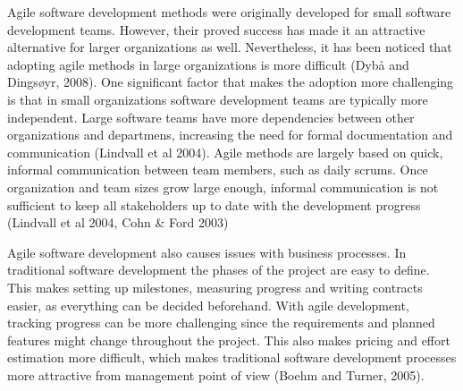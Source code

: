 Agile software development methods were originally developed for small
software development teams. However, their proved success has made it an
attractive alternative for larger organizations as well. Nevertheless,
it has been noticed that adopting agile methods in large organizations
is more difficult (Dybå and Dingsøyr, 2008). One significant factor
that makes the adoption more challenging is that in small organizations
software development teams are typically more independent. Large
software teams have more dependencies between other organizations
and departmens, increasing the need for formal documentation and
communication (Lindvall et al 2004). Agile methods are largely based
on quick, informal communication between team members, such as daily
scrums. Once organization and team sizes grow large enough, informal
communication is not sufficient to keep all stakeholders up to date with
the development progress (Lindvall et al 2004, Cohn \& Ford 2003)

Agile software development also causes issues with business processes.
In traditional software development the phases of the project are easy to
define. This makes setting up milestones, measuring progress and writing
contracts easier, as everything can be decided beforehand. With agile
development, tracking progress can be more challenging since the requirements
and planned features might change throughout the project. This also makes
pricing and effort estimation more difficult, which makes traditional software
development processes more attractive from management point of view (Boehm and
Turner, 2005).
